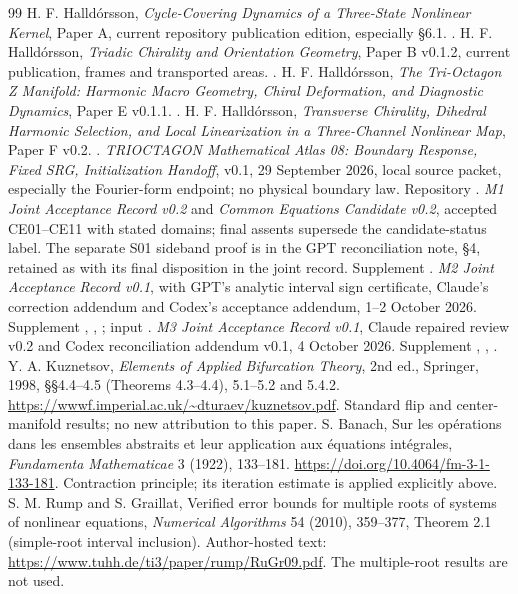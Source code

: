 \documentclass[11pt,a4paper]{article}
\begin{document}
\begin{thebibliography}{99}\small
{} H. F. Halldórsson, \emph{Cycle-Covering Dynamics of a Three-State Nonlinear Kernel}, Paper A, current repository publication edition, especially \S6.1. .
 H. F. Halldórsson, \emph{Triadic Chirality and Orientation Geometry}, Paper B v0.1.2, current publication, frames and transported areas. .
 H. F. Halldórsson, \emph{The Tri-Octagon Z Manifold: Harmonic Macro Geometry, Chiral Deformation, and Diagnostic Dynamics}, Paper E v0.1.1. .
 H. F. Halldórsson, \emph{Transverse Chirality, Dihedral Harmonic Selection, and Local Linearization in a Three-Channel Nonlinear Map}, Paper F v0.2. .
 \emph{TRIOCTAGON Mathematical Atlas 08: Boundary Response, Fixed SRG, Initialization Handoff}, v0.1, 29 September 2026, local source packet, especially the Fourier-form endpoint; no physical boundary law. Repository .
 \emph{M1 Joint Acceptance Record v0.2} and \emph{Common Equations Candidate v0.2}, accepted CE01--CE11 with stated domains; final assents supersede the candidate-status label. The separate S01 sideband proof is in the GPT reconciliation note, \S4, retained as  with its final disposition in the joint record. Supplement .
 \emph{M2 Joint Acceptance Record v0.1}, with GPT's analytic interval sign certificate, Claude's correction addendum and Codex's acceptance addendum, 1--2 October 2026. Supplement , , ; input .
 \emph{M3 Joint Acceptance Record v0.1}, Claude repaired review v0.2 and Codex reconciliation addendum v0.1, 4 October 2026. Supplement , , .
 Y. A. Kuznetsov, \emph{Elements of Applied Bifurcation Theory}, 2nd ed., Springer, 1998, \S\S4.4--4.5 (Theorems 4.3--4.4), 5.1--5.2 and 5.4.2. \url{https://wwwf.imperial.ac.uk/~dturaev/kuznetsov.pdf}. Standard flip and center-manifold results; no new attribution to this paper.
 S. Banach, Sur les opérations dans les ensembles abstraits et leur application aux équations intégrales, \emph{Fundamenta Mathematicae} 3 (1922), 133--181. \url{https://doi.org/10.4064/fm-3-1-133-181}. Contraction principle; its iteration estimate is applied explicitly above.
 S. M. Rump and S. Graillat, Verified error bounds for multiple roots of systems of nonlinear equations, \emph{Numerical Algorithms} 54 (2010), 359--377, Theorem 2.1 (simple-root interval inclusion). Author-hosted text: \url{https://www.tuhh.de/ti3/paper/rump/RuGr09.pdf}. The multiple-root results are not used.
\end{thebibliography}
\end{document}
